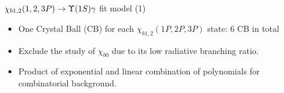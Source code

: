 \begin{frame}{$\chi_{b1,2}(1,2,3P) \to \OneS \gamma$ fit model (1)}

\centering
\setlength{\unitlength}{1mm}

\begin{itemize}
\item One Crystal Ball (CB) for each $\chi_{b1,2}(1P,2P,3P)$ state: 6 CB in total
\item Exclude the study of $\chi_{b0}$ due to its low radiative branching ratio.
\item Product of exponential and linear combination of 
polynomials  for combinatorial background.
\end{itemize}

\end{frame}
